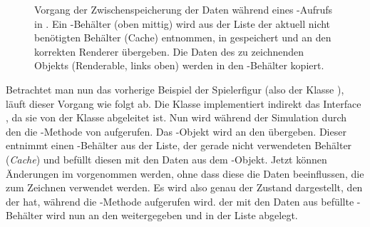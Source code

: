 \begin{figure}
	\centering
		\caption[Vorgang der Zwischenspeicherung der Daten während eines -Aufrufs in .]{Vorgang der Zwischenspeicherung der Daten während eines -Aufrufs in . Ein -Behälter (oben mittig) wird aus der Liste der aktuell nicht benötigten Behälter (Cache) entnommen, in  gespeichert und an den korrekten Renderer übergeben. Die Daten des zu zeichnenden Objekts (Renderable, links oben) werden in den -Behälter kopiert.}\label{fig:copyRenderable}
\end{figure}


\begin{leftrule}
	Betrachtet man nun das vorherige Beispiel der Spielerfigur (also der Klasse ), läuft dieser Vorgang wie folgt ab. Die Klasse  implementiert indirekt das Interface , da sie von der Klasse  abgeleitet ist. Nun wird während der Simulation durch den  die -Methode von  aufgerufen. Das -Objekt wird an den  übergeben. Dieser entnimmt einen -Behälter aus der Liste, der gerade nicht verwendeten Behälter (\emph{Cache}) und befüllt diesen mit den Daten aus dem -Objekt. Jetzt können Änderungen im  vorgenommen werden, ohne dass diese die Daten beeinflussen, die zum Zeichnen verwendet werden. Es wird also genau der Zustand dargestellt, den der  hat, während die -Methode aufgerufen wird. der mit den Daten aus  befüllte -Behälter wird nun an den  weitergegeben und in der Liste  abgelegt.
\end{leftrule}


